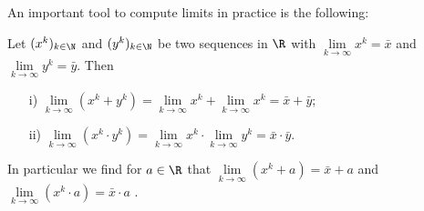 {%
\begin{frame} 
%
An important tool to compute limits in practice is the following:
\begin{theo}
	Let $(x^k)_{k\in \N}$ and $(y^k)_{k\in \N}$ be two sequences in $\R$ with $\lim\limits_{k\to\infty}x^k= \bar{x}$ and $\lim\limits_{k\to\infty}y^k= \bar{y}$. Then
	\begin{itemize}
		\item[i)] $\lim\limits_{k\to\infty} (x^k + y^k) = \lim\limits_{k\to\infty}x^k + \lim\limits_{k\to\infty}x^k = \bar{x}+\bar{y}$;
		\item[ii)] $\lim\limits_{k\to\infty} (x^k\cdot y^k) = \lim\limits_{k\to\infty}x^k \cdot \lim\limits_{k\to\infty}y^k = \bar{x}\cdot\bar{y}$.
	\end{itemize}
	In particular we find for $a \in \R$ that $\lim\limits_{k\to\infty} (x^k + a) = \bar{x} +a$ and $\lim\limits_{k\to\infty} (x^k \cdot a) = \bar{x}\cdot a$ .
\end{theo} 
\end{frame}}
